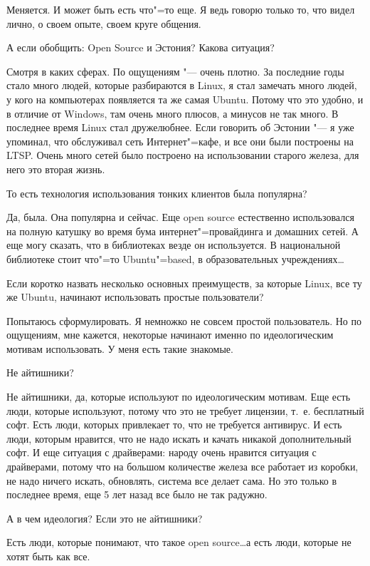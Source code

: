 \documentclass[10pt, a5paper]{article}
\begin{document}
\a Меняется. И может быть есть что"=то еще. Я ведь говорю только то, что видел лично, о своем опыте, своем круге общения.

\q А если обобщить: Open Source и Эстония? Какова ситуация?

\a Смотря в каких сферах. По ощущениям "--- очень плотно. За последние годы стало много людей, которые разбираются в Linux, я стал замечать много людей, у кого на компьютерах появляется та же самая Ubuntu. Потому что это удобно, и в отличие от Windows, там очень много плюсов, а минусов не так много. В последнее время Linux стал дружелюбнее. Если говорить об Эстонии "--- я уже упоминал, что обслуживал сеть Интернет"=кафе, и все они были построены на LTSP. Очень много сетей было построено на использовании старого железа, для него это вторая жизнь. 

\q То есть технология использования тонких клиентов была популярна?

\a Да, была. Она популярна и сейчас. Еще open source естественно использовался на полную катушку во время бума интернет"=провайдинга и домашних сетей. А еще могу сказать, что в библиотеках везде он используется. В национальной библиотеке стоит что"=то Ubuntu"=based, в образовательных учреждениях\ldots

\q Если коротко назвать несколько основных преимуществ, за которые Linux, все ту же Ubuntu, начинают использовать простые пользователи?

\a Попытаюсь сформулировать. Я немножко не совсем простой пользователь. Но по ощущениям, мне кажется, некоторые начинают именно по идеологическим мотивам использовать. У меня есть такие знакомые.

\q Не айтишники?

\a Не айтишники, да, которые используют по идеологическим мотивам. Еще есть люди, которые используют, потому что это не требует лицензии, т.~е. бесплатный софт. Есть люди, которых привлекает то, что не требуется антивирус. И есть люди, которым нравится, что не надо искать и качать никакой дополнительный софт. И еще ситуация с драйверами: народу очень нравится ситуация с драйверами, потому что на большом количестве железа все работает из коробки, не надо ничего искать, обновлять, система все делает сама. Но это только в последнее время, еще 5 лет назад все было не так радужно.

\q А в чем идеология? Если это не айтишники?

\a Есть люди, которые понимают, что такое open source\ldots а есть люди, которые не хотят быть как все. 
\end{document}
